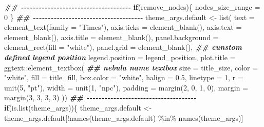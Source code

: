\documentclass[
]{article}
\newenvironment{Shaded}{\begin{snugshade}}{\end{snugshade}}
\newcommand{\AttributeTok}[1]{\textcolor[rgb]{0.77,0.63,0.00}{#1}}
\newcommand{\ControlFlowTok}[1]{\textcolor[rgb]{0.13,0.29,0.53}{\textbf{#1}}}
\newcommand{\DecValTok}[1]{\textcolor[rgb]{0.00,0.00,0.81}{#1}}
\newcommand{\DocumentationTok}[1]{\textcolor[rgb]{0.56,0.35,0.01}{\textbf{\textit{#1}}}}
\newcommand{\FloatTok}[1]{\textcolor[rgb]{0.00,0.00,0.81}{#1}}
\newcommand{\FunctionTok}[1]{\textcolor[rgb]{0.00,0.00,0.00}{#1}}
\newcommand{\NormalTok}[1]{#1}
\newcommand{\OtherTok}[1]{\textcolor[rgb]{0.56,0.35,0.01}{#1}}
\newcommand{\SpecialCharTok}[1]{\textcolor[rgb]{0.00,0.00,0.00}{#1}}
\newcommand{\StringTok}[1]{\textcolor[rgb]{0.31,0.60,0.02}{#1}}
\begin{document}
\begin{Shaded}
\begin{Highlighting}[]
    \DocumentationTok{\#\# {-}{-}{-}{-}{-}{-}{-}{-}{-}{-}{-}{-}{-}{-}{-}{-}{-}{-}{-}{-}{-}{-}{-}{-}{-}{-}{-}{-}{-}{-}{-}{-}{-}{-}{-}{-}{-} }
    \ControlFlowTok{if}\NormalTok{(remove\_nodes)\{}
\NormalTok{      nodes\_size\_range }\OtherTok{=} \DecValTok{0}
\NormalTok{    \}}
    \DocumentationTok{\#\# {-}{-}{-}{-}{-}{-}{-}{-}{-}{-}{-}{-}{-}{-}{-}{-}{-}{-}{-}{-}{-}{-}{-}{-}{-}{-}{-}{-}{-}{-}{-}{-}{-}{-}{-}{-}{-} }
\NormalTok{    theme\_args.default }\OtherTok{\textless{}{-}} \FunctionTok{list}\NormalTok{(}
        \AttributeTok{text =} \FunctionTok{element\_text}\NormalTok{(}\AttributeTok{family =} \StringTok{"Times"}\NormalTok{),}
        \AttributeTok{axis.ticks =} \FunctionTok{element\_blank}\NormalTok{(),}
        \AttributeTok{axis.text =} \FunctionTok{element\_blank}\NormalTok{(),}
        \AttributeTok{axis.title =} \FunctionTok{element\_blank}\NormalTok{(),}
        \AttributeTok{panel.background =} \FunctionTok{element\_rect}\NormalTok{(}\AttributeTok{fill =} \StringTok{"white"}\NormalTok{),}
        \AttributeTok{panel.grid =} \FunctionTok{element\_blank}\NormalTok{(),}
        \DocumentationTok{\#\# cunstom defined legend position}
        \AttributeTok{legend.position =}\NormalTok{ legend\_position,}
        \AttributeTok{plot.title =}\NormalTok{ ggtext}\SpecialCharTok{::}\FunctionTok{element\_textbox}\NormalTok{(}
          \DocumentationTok{\#\# nebula name textbox}
          \AttributeTok{size =}\NormalTok{ title\_size,}
          \AttributeTok{color =} \StringTok{"white"}\NormalTok{, }\AttributeTok{fill =}\NormalTok{ title\_fill, }\AttributeTok{box.color =} \StringTok{"white"}\NormalTok{,}
          \AttributeTok{halign =} \FloatTok{0.5}\NormalTok{, }\AttributeTok{linetype =} \DecValTok{1}\NormalTok{, }\AttributeTok{r =} \FunctionTok{unit}\NormalTok{(}\DecValTok{5}\NormalTok{, }\StringTok{"pt"}\NormalTok{), }\AttributeTok{width =} \FunctionTok{unit}\NormalTok{(}\DecValTok{1}\NormalTok{, }\StringTok{"npc"}\NormalTok{),}
          \AttributeTok{padding =} \FunctionTok{margin}\NormalTok{(}\DecValTok{2}\NormalTok{, }\DecValTok{0}\NormalTok{, }\DecValTok{1}\NormalTok{, }\DecValTok{0}\NormalTok{), }\AttributeTok{margin =} \FunctionTok{margin}\NormalTok{(}\DecValTok{3}\NormalTok{, }\DecValTok{3}\NormalTok{, }\DecValTok{3}\NormalTok{, }\DecValTok{3}\NormalTok{)}
\NormalTok{        ))}
    \DocumentationTok{\#\# {-}{-}{-}{-}{-}{-}{-}{-}{-}{-}{-}{-}{-}{-}{-}{-}{-}{-}{-}{-}{-}{-}{-}{-}{-}{-}{-}{-}{-}{-}{-}{-}{-}{-}{-}{-}{-} }
    \ControlFlowTok{if}\NormalTok{(}\FunctionTok{is.list}\NormalTok{(theme\_args))\{}
\NormalTok{      theme\_args.default }\OtherTok{\textless{}{-}}\NormalTok{ theme\_args.default[}\SpecialCharTok{!}\FunctionTok{names}\NormalTok{(theme\_args.default) }\SpecialCharTok{\%in\%} \FunctionTok{names}\NormalTok{(theme\_args)]}

\end{Highlighting}
\end{Shaded}
\end{document}

